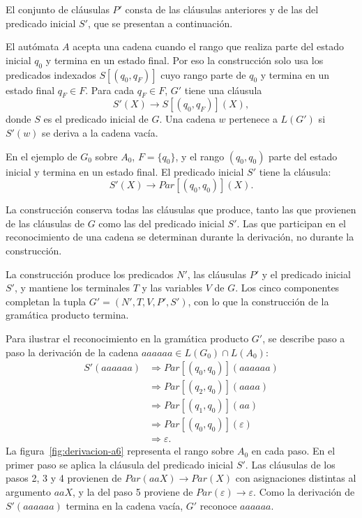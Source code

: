\documentclass{report}
\theoremstyle{definition}
\theoremstyle{plain}
\theoremstyle{remark}
\begin{document}
El conjunto de cláusulas $P'$ consta de las cláusulas anteriores y de
las del predicado inicial $S'$, que se presentan a continuación.

El autómata $A$ acepta una cadena cuando el rango que realiza parte
del estado inicial $q_0$ y termina en un estado final. Por eso la
construcción solo usa los predicados indexados $S[(q_0, q_F)]$ cuyo
rango parte de $q_0$ y termina en un estado final $q_F \in F$. Para
cada $q_F \in F$, $G'$ tiene una cláusula
\[
  S'(X) \to S[(q_0, q_F)](X),
\]
donde $S$ es el predicado inicial de $G$. Una cadena $w$ pertenece a
$L(G')$ si $S'(w)$ se deriva a la cadena vacía.

En el ejemplo de $G_0$ sobre $A_0$, $F = \{q_0\}$, y el rango
$(q_0, q_0)$ parte del estado inicial y termina en un estado final. El
predicado inicial $S'$ tiene la cláusula:
\[
  S'(X) \to Par[(q_0, q_0)](X).
\]

La construcción conserva todas las cláusulas que produce, tanto las
que provienen de las cláusulas de $G$ como las del predicado inicial
$S'$. Las que participan en el reconocimiento de una cadena se
determinan durante la derivación, no durante la construcción.

La construcción produce los predicados $N'$, las cláusulas $P'$ y el
predicado inicial $S'$, y mantiene los terminales $T$ y las variables
$V$ de $G$. Los cinco componentes completan la tupla
$G' = (N', T, V, P', S')$, con lo que la construcción de la gramática
producto termina.

Para ilustrar el reconocimiento en la gramática producto $G'$, se
describe paso a paso la derivación de la cadena
$aaaaaa \in L(G_0) \cap L(A_0)$:
\begin{align*}
  S'(aaaaaa) &\Rightarrow Par[(q_0, q_0)](aaaaaa) \\
          &\Rightarrow Par[(q_2, q_0)](aaaa) \\
          &\Rightarrow Par[(q_1, q_0)](aa) \\
          &\Rightarrow Par[(q_0, q_0)](\varepsilon) \\
          &\Rightarrow \varepsilon.
\end{align*}
La figura~\ref{fig:derivacion-a6} representa el rango sobre $A_0$ en
cada paso. En el primer paso se aplica la cláusula del predicado
inicial $S'$. Las cláusulas de los pasos 2, 3 y 4 provienen de
$Par(aaX) \to Par(X)$ con asignaciones distintas al argumento $aaX$, y
la del paso 5 proviene de $Par(\varepsilon) \to \varepsilon$. Como la derivación de $S'(aaaaaa)$ termina en la cadena vacía, $G'$
reconoce $aaaaaa$.
\end{document}
